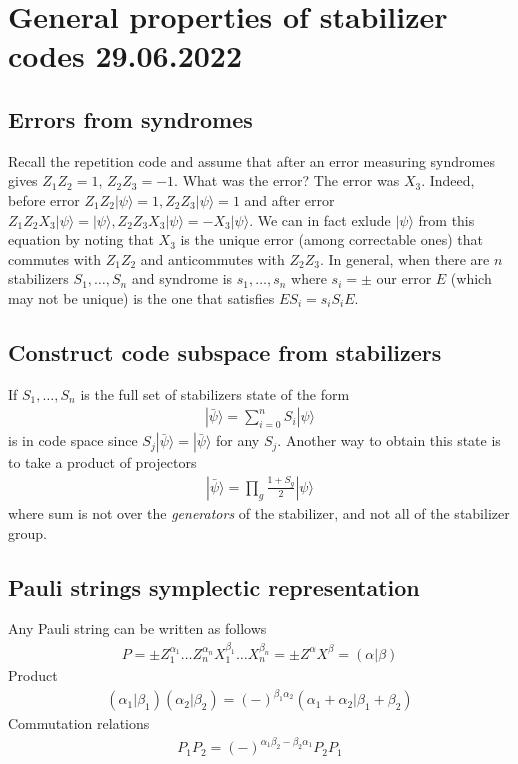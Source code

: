 \documentclass[12 pt]{article}
\begin{document}
\section{General properties of stabilizer codes 29.06.2022}
\subsection{Errors from syndromes}
Recall the repetition code and assume that after an error measuring syndromes gives $Z_1Z_2=1$, $Z_2Z_3=-1$. What was the error? The error was $X_3$. Indeed, before error $Z_1Z_2|\psi\rangle=1, Z_2Z_3|\psi\rangle=1$ and after error $Z_1Z_2X_3|\psi\rangle=|\psi\rangle, Z_2Z_3X_3|\psi\rangle=-X_3|\psi\rangle$. We can in fact exlude $|\psi\rangle$ from this equation by noting that $X_3$ is the unique error (among correctable ones) that commutes with $Z_1Z_2$ and anticommutes with $Z_2Z_3$. In general, when there are $n$ stabilizers $S_1,\dots, S_n$ and syndrome is $s_1,\dots,s_n$ where $s_i=\pm$ our error $E$ (which may not be unique) is the one that satisfies $E S_i=s_i S_i E$.
\subsection{Construct code subspace from stabilizers}
If $S_1,\dots,S_n$ is the full set of stabilizers state of the form
\begin{align}
|\bar{\psi}\rangle=\sum_{i=0}^n S_i |\psi\rangle
\end{align}
is in code space since $S_j|\bar{\psi}\rangle=|\bar{\psi}\rangle$ for any $S_j$. Another way to obtain this state is to take a product of projectors
\begin{align}
|\bar{\psi}\rangle=\prod_{g}\frac{1+S_g}{2} |\psi\rangle
\end{align}
where sum is not over the \textit{generators} of the stabilizer, and not all of the stabilizer group.
\subsection{Pauli strings symplectic representation}
Any Pauli string can be written as follows
\begin{align}
P =\pm Z_1^{\alpha_1}\dots Z_n^{\alpha_n} X_1^{\beta_1}\dots X_n^{\beta_n} =\pm Z^{\alpha} X^\beta= (\alpha|\beta)
\end{align}
Product
\begin{align}
(\alpha_1|\beta_1)(\alpha_2|\beta_2)=(-)^{\beta_1\alpha_2}(\alpha_1+\alpha_2|\beta_1+\beta_2)
\end{align}
Commutation relations 
\begin{align}
P_1 P_2 = (-)^{\alpha_1\beta_2-\beta_2\alpha_1}P_2P_1
\end{align}
\end{document}
